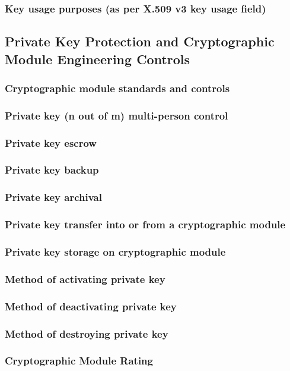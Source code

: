 \documentclass[10pt]{article}
\begin{document}
\subsubsection{Key usage purposes (as per X.509 v3 key usage field)}
\subsection{Private Key Protection and Cryptographic Module Engineering Controls}
\subsubsection{Cryptographic module standards and controls}
\subsubsection{Private key (n out of m) multi-person control}
\subsubsection{Private key escrow}
\subsubsection{Private key backup}
\subsubsection{Private key archival}
\subsubsection{Private key transfer into or from a cryptographic module}
\subsubsection{Private key storage on cryptographic module}
\subsubsection{Method of activating private key}
\subsubsection{Method of deactivating private key}
\subsubsection{Method of destroying private key}
\subsubsection{Cryptographic Module Rating}
\end{document}
